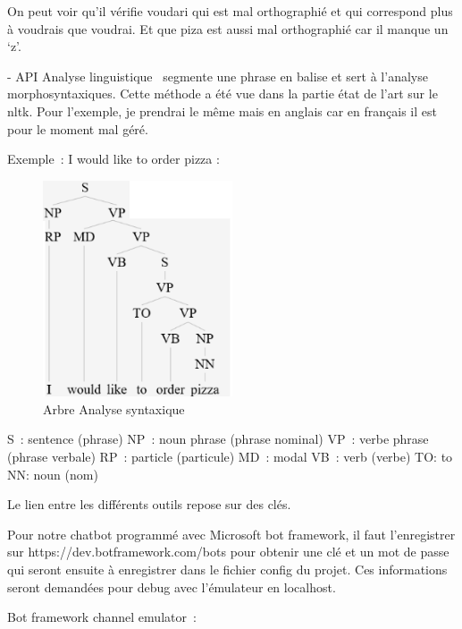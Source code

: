 On peut voir qu’il vérifie voudari qui est mal orthographié et qui correspond plus à voudrais que voudrai. Et que piza est aussi mal orthographié car il manque un ‘z’.
\vspace{1em}


- API Analyse linguistique  segmente une phrase en balise et sert à l’analyse morphosyntaxiques. Cette méthode a été vue dans la partie état de l’art sur le nltk. Pour l’exemple, je prendrai le même mais en anglais  car en français il est pour le moment mal géré.
\vspace{1em}

Exemple : I would like to order pizza :

\begin{figure}[H]
	\centering
		\includegraphics[width = 0.5\textwidth]{analyse.png}
	\caption{Arbre Analyse syntaxique}
	\label{fig:Arbre Analyse syntaxique}
\end{figure}

S : sentence (phrase)
NP : noun phrase (phrase nominal)
VP : verbe phrase (phrase verbale)
RP : particle (particule)
MD : modal
VB : verb (verbe)
TO: to 
NN: noun (nom)


Le lien entre les différents outils repose sur des clés.
\vspace{1em}

Pour notre chatbot programmé avec Microsoft bot framework, il faut l’enregistrer sur https://dev.botframework.com/bots pour obtenir une clé et un mot de passe qui seront ensuite à enregistrer dans le fichier config du projet.  Ces informations seront demandées pour debug avec l’émulateur en localhost.
\vspace{1em}


Bot framework channel emulator :


